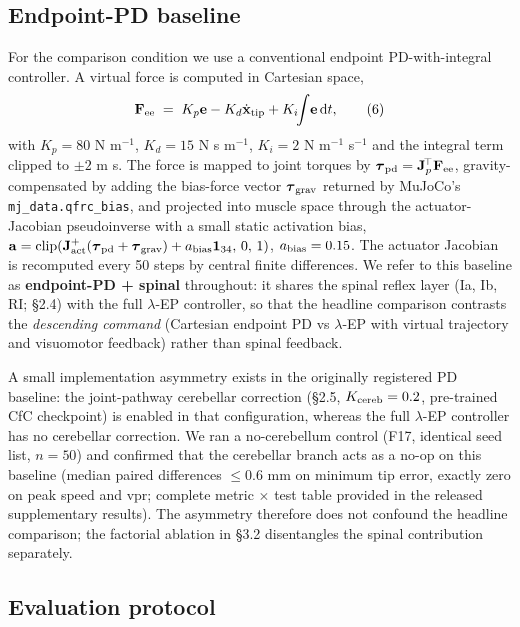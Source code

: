 \documentclass[sn-basic]{sn-jnl}
\begin{document}
\subsection{Endpoint-PD baseline}

For the comparison condition we use a conventional endpoint
PD-with-integral controller. A virtual force is computed in Cartesian
space, \[
\mathbf{F}_{\rm ee} \;=\; K_{p}\mathbf{e} - K_{d}\dot{\mathbf{x}}_{\rm tip} + K_{i}\!\!\int\!\mathbf{e}\,\mathrm{d}t, \tag{6}
\] with \(K_{p} = 80\) N m\(^{-1}\), \(K_{d} = 15\) N s m\(^{-1}\),
\(K_{i} = 2\) N m\(^{-1}\) s\(^{-1}\) and the integral term clipped to
\(\pm 2\) m s. The force is mapped to joint torques by
\(\boldsymbol{\tau}_{\rm pd} = \mathbf{J}_{p}^{\!\top}\mathbf{F}_{\rm ee}\),
gravity-compensated by adding the bias-force vector
\(\boldsymbol{\tau}_{\rm grav}\) returned by MuJoCo's
\texttt{mj\_data.qfrc\_bias}, and projected into muscle space through
the actuator-Jacobian pseudoinverse with a small static activation bias,
\(\mathbf{a} = \mathrm{clip}(\mathbf{J}_{\rm act}^{+}(\boldsymbol{\tau}_{\rm pd}+\boldsymbol{\tau}_{\rm grav})+a_{\rm bias}\mathbf{1}_{34},\,0,\,1)\),
\(a_{\rm bias} = 0.15\). The actuator Jacobian is recomputed every 50
steps by central finite differences. We refer to this baseline as
\textbf{endpoint-PD + spinal} throughout: it shares the spinal reflex
layer (Ia, Ib, RI; §2.4) with the full $\lambda$-EP controller, so that the
headline comparison contrasts the \emph{descending command} (Cartesian
endpoint PD vs $\lambda$-EP with virtual trajectory and visuomotor feedback)
rather than spinal feedback.

A small implementation asymmetry exists in the originally registered PD
baseline: the joint-pathway cerebellar correction (§2.5,
\(K_{\rm cereb} = 0.2\), pre-trained CfC checkpoint) is enabled in that
configuration, whereas the full $\lambda$-EP controller has no cerebellar
correction. We ran a no-cerebellum control (F17, identical seed list,
\(n = 50\)) and confirmed that the cerebellar branch acts as a no-op on
this baseline (median paired differences \(\le 0.6\) mm on minimum tip
error, exactly zero on peak speed and vpr; complete metric $\times$ test table
provided in the released supplementary results). The asymmetry therefore
does not confound the headline comparison; the factorial ablation in
§3.2 disentangles the spinal contribution separately.

\subsection{Evaluation protocol}
\end{document}
